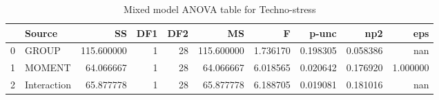 \begin{table}[h]
\centering
\caption{Mixed model ANOVA table for Techno-stress }
\label{tab:ANOVAMixedModelMAAS}
\begin{tabular}{llrrrrrrrr}
\toprule
 & Source & SS & DF1 & DF2 & MS & F & p-unc & np2 & eps \\
\midrule
0 & GROUP & 115.600000 & 1 & 28 & 115.600000 & 1.736170 & 0.198305 & 0.058386 & nan \\
1 & MOMENT & 64.066667 & 1 & 28 & 64.066667 & 6.018565 & 0.020642 & 0.176920 & 1.000000 \\
2 & Interaction & 65.877778 & 1 & 28 & 65.877778 & 6.188705 & 0.019081 & 0.181016 & nan \\
\bottomrule
\end{tabular}
\end{table}
